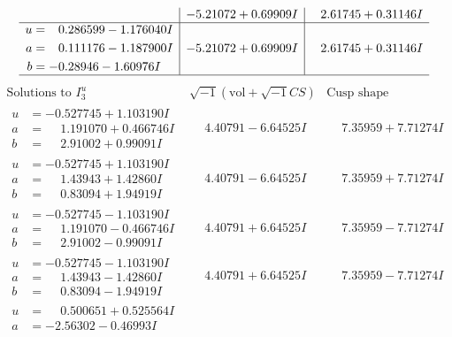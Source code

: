\documentclass[1p]{elsarticle_modified}
\theoremstyle{definition}
\newcommand{\I}{\sqrt{-1}}
\begin{document}
$$\begin{array}{c|c|c}
 & -5.21072 + 0.69909 I & \phantom{-}2.61745 + 0.31146 I \\ \hline\begin{aligned}
u &= \phantom{-}0.286599 - 1.176040 I \\
a &= \phantom{-}0.111176 - 1.187900 I \\
b &= -0.28946 - 1.60976 I\end{aligned}
 & -5.21072 + 0.69909 I & \phantom{-}2.61745 + 0.31146 I\\
 \hline 
 \end{array}$$\newpage$$\begin{array}{c|c|c}  
\text{Solutions to }I^u_{3}& \I (\text{vol} + \sqrt{-1}CS) & \text{Cusp shape}\\
 \hline 
\begin{aligned}
u &= -0.527745 + 1.103190 I \\
a &= \phantom{-}1.191070 + 0.466746 I \\
b &= \phantom{-}2.91002 + 0.99091 I\end{aligned}
 & \phantom{-}4.40791 - 6.64525 I & \phantom{-}7.35959 + 7.71274 I \\ \hline\begin{aligned}
u &= -0.527745 + 1.103190 I \\
a &= \phantom{-}1.43943 + 1.42860 I \\
b &= \phantom{-}0.83094 + 1.94919 I\end{aligned}
 & \phantom{-}4.40791 - 6.64525 I & \phantom{-}7.35959 + 7.71274 I \\ \hline\begin{aligned}
u &= -0.527745 - 1.103190 I \\
a &= \phantom{-}1.191070 - 0.466746 I \\
b &= \phantom{-}2.91002 - 0.99091 I\end{aligned}
 & \phantom{-}4.40791 + 6.64525 I & \phantom{-}7.35959 - 7.71274 I \\ \hline\begin{aligned}
u &= -0.527745 - 1.103190 I \\
a &= \phantom{-}1.43943 - 1.42860 I \\
b &= \phantom{-}0.83094 - 1.94919 I\end{aligned}
 & \phantom{-}4.40791 + 6.64525 I & \phantom{-}7.35959 - 7.71274 I \\ \hline\begin{aligned}
u &= \phantom{-}0.500651 + 0.525564 I \\
a &= -2.56302 - 0.46993 I \\

\end{aligned}
\end{array}$$
\end{document}
